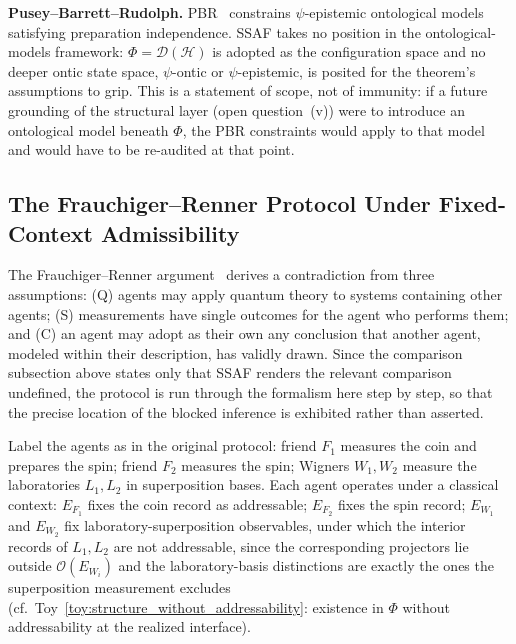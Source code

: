 \documentclass[aps,prx,onecolumn,11pt]{revtex4-2}
\theoremstyle{plain}
\theoremstyle{definition}
\theoremstyle{remark}
\begin{document}
\textbf{Pusey--Barrett--Rudolph.}
PBR~\cite{PBR2012} constrains \(\psi\)-epistemic ontological models
satisfying preparation independence. SSAF takes no position in the
ontological-models framework: \(\Phi=\mathcal D(\mathcal H)\) is
adopted as the configuration space and no deeper ontic state space,
\(\psi\)-ontic or \(\psi\)-epistemic, is posited for the theorem's
assumptions to grip. This is a statement of scope, not of immunity: if
a future grounding of the structural layer (open
question~(v)) were to introduce an ontological model beneath \(\Phi\),
the PBR constraints would apply to that model and would have to be
re-audited at that point.

\subsection{The Frauchiger--Renner Protocol Under Fixed-Context Admissibility}
\label{subsec:fr_walkthrough}

The Frauchiger--Renner argument~\cite{FrauchigerRenner2018} derives a
contradiction from three assumptions: (Q) agents may apply quantum
theory to systems containing other agents; (S) measurements have single
outcomes for the agent who performs them; and (C) an agent may adopt as
their own any conclusion that another agent, modeled within their
description, has validly drawn. Since the comparison subsection above
states only that SSAF renders the relevant comparison undefined, the
protocol is run through the formalism here step by step, so that the
precise location of the blocked inference is exhibited rather than
asserted.

Label the agents as in the original protocol: friend \(F_1\) measures
the coin and prepares the spin; friend \(F_2\) measures the spin;
Wigners \(W_1, W_2\) measure the laboratories \(L_1, L_2\) in
superposition bases. Each agent operates under a classical context:
\(E_{F_1}\) fixes the coin record as addressable; \(E_{F_2}\) fixes the
spin record; \(E_{W_1}\) and \(E_{W_2}\) fix laboratory-superposition
observables, under which the interior records of \(L_1, L_2\) are not
addressable, since the corresponding projectors lie outside
\(\mathcal O(E_{W_i})\) and the laboratory-basis distinctions are
exactly the ones the superposition measurement excludes
(cf.\ Toy~\ref{toy:structure_without_addressability}: existence
in \(\Phi\) without addressability at the realized interface).
\end{document}

